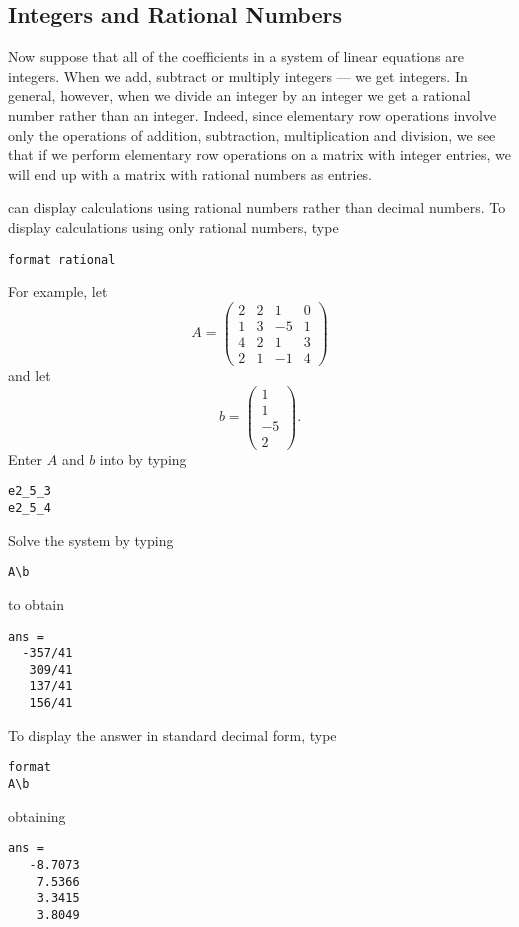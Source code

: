\subsection*{Integers and Rational Numbers}

Now suppose that all of the coefficients in a system of linear
equations are integers.  When we add, subtract or multiply
integers --- we get integers.  In general, however, when we
divide an integer by an integer we get a rational number rather
than an integer.  Indeed, since elementary row operations
involve only the operations of addition, subtraction,
multiplication and division, we see that if we perform
elementary row operations on a matrix with integer entries, we
will end up with a matrix with rational numbers as entries.

\Matlab can display calculations using rational numbers rather
than decimal numbers.  To display calculations using only
rational numbers, type
\begin{verbatim}
format rational
\end{verbatim} 
For example, let
\begin{equation*} \label{e:A4}
A=\left(\begin{array}{ccrc} 2 & 2 & 1 & 0\\ 1 & 3 & -5 & 1\\
4 & 2 & 1 & 3 \\ 2 & 1 & -1 & 4\end{array}\right)
\end{equation*}
and let
\begin{equation*} \label{e:b4}
b=\left(\begin{array}{r} 1 \\ 1 \\ -5 \\2 \end{array} \right).
\end{equation*}
Enter $A$ and $b$ into \Matlab by typing
\begin{verbatim}
e2_5_3
e2_5_4
\end{verbatim}
Solve the system by typing
\begin{verbatim}
A\b
\end{verbatim}
to obtain
\begin{verbatim}
ans =
  -357/41
   309/41
   137/41
   156/41
\end{verbatim}
To display the answer in standard decimal form, type
\begin{verbatim}
format
A\b
\end{verbatim}
obtaining
\begin{verbatim}
ans =
   -8.7073
    7.5366
    3.3415
    3.8049
\end{verbatim}


